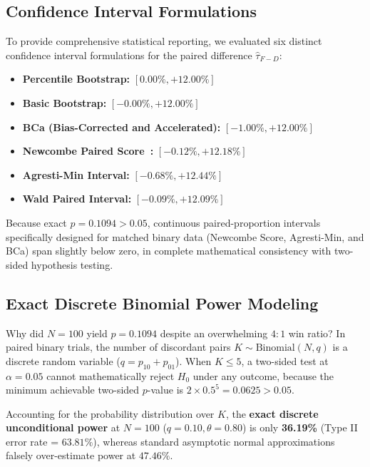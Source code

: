 \documentclass[11pt]{article}
\begin{document}
\subsection{Confidence Interval Formulations}
To provide comprehensive statistical reporting, we evaluated six distinct confidence interval formulations for the paired difference $\hat{\tau}_{F-D}$:
\begin{itemize}
    \item \textbf{Percentile Bootstrap:} $[0.00\%, +12.00\%]$
    \item \textbf{Basic Bootstrap:} $[-0.00\%, +12.00\%]$
    \item \textbf{BCa (Bias-Corrected and Accelerated):} $[-1.00\%, +12.00\%]$
    \item \textbf{Newcombe Paired Score~\cite{Newcombe1998Improved}:} $[-0.12\%, +12.18\%]$
    \item \textbf{Agresti-Min Interval:} $[-0.68\%, +12.44\%]$
    \item \textbf{Wald Paired Interval:} $[-0.09\%, +12.09\%]$
\end{itemize}
Because exact $p = 0.1094 > 0.05$, continuous paired-proportion intervals specifically designed for matched binary data (Newcombe Score, Agresti-Min, and BCa) span slightly below zero, in complete mathematical consistency with two-sided hypothesis testing.

\subsection{Exact Discrete Binomial Power Modeling}
Why did $N=100$ yield $p = 0.1094$ despite an overwhelming $4:1$ win ratio? In paired binary trials, the number of discordant pairs $K \sim \text{Binomial}(N, q)$ is a discrete random variable ($q = p_{10} + p_{01}$). When $K \le 5$, a two-sided test at $\alpha = 0.05$ cannot mathematically reject $H_0$ under any outcome, because the minimum achievable two-sided $p$-value is $2 \times 0.5^5 = 0.0625 > 0.05$.

Accounting for the probability distribution over $K$, the \textbf{exact discrete unconditional power} at $N=100$ ($q = 0.10, \theta = 0.80$) is only \textbf{36.19\%} (Type II error rate = $63.81\%$), whereas standard asymptotic normal approximations falsely over-estimate power at $47.46\%$. 
\end{document}
